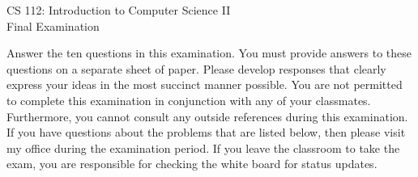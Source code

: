 \documentclass[12pt]{article}
\def\widow#1{\vskip #1\vbadness10000\penalty-200\vskip-#1}
\begin{document}
\def\widow#1{\vskip #1\vbadness10000\penalty-200\vskip-#1}

\begin{center}

CS 112: Introduction to Computer Science II \\
Final Examination \\

\end{center}

\noindent
Answer the ten questions in this examination.  You must provide
answers to these questions on a separate sheet of paper.  Please
develop responses that clearly express your ideas in the most succinct
manner possible.  You are not permitted to complete this examination
in conjunction with any of your classmates.  Furthermore, you cannot
consult any outside references during this examination.  If you have
questions about the problems that are listed below, then please visit
my office during the examination period.  If you leave the classroom
to take the exam, you are responsible for checking the white board for
status updates.

\newpage
\end{document}
